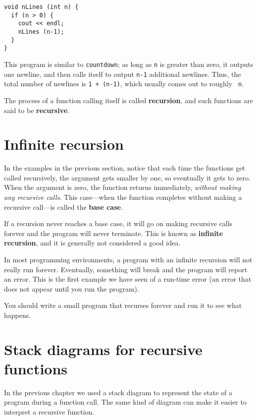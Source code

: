 \begin{verbatim}
void nLines (int n) {
  if (n > 0) {
    cout << endl;
    nLines (n-1);
  }
}
\end{verbatim}
%
This program is similar to {\tt countdown}; as long as {\tt n} is
greater than zero, it outputs one newline, and then calls itself to
output {\tt n-1} additional newlines.  Thus, the total number of
newlines is {\tt 1 + (n-1)}, which usually comes out to roughly {\tt
n}.


The process of a function calling itself is called {\bf recursion}, and
such functions are said to be {\bf recursive}.

\section {Infinite recursion}

In the examples in the previous section, notice that each time the
functions get called recursively, the argument gets smaller by one, so
eventually it gets to zero.  When the argument is zero, the function
returns immediately, {\em without making any recursive calls}.
This case---when the function completes without making a recursive
call---is called the {\bf base case}.

If a recursion never reaches a base case, it will go on making recursive
calls forever and the program will never terminate.  This is known as
{\bf infinite recursion}, and it is generally not considered a good
idea.


In most programming environments, a program with an infinite
recursion will not really run forever.  Eventually, something
will break and the program will report an error.  This is the
first example we have seen of a run-time error (an error that
does not appear until you run the program).

You should write a small program that recurses forever and run
it to see what happens.

\section {Stack diagrams for recursive functions}

In the previous chapter we used a stack diagram to represent the
state of a program during a function call.  The same kind
of diagram can make it easier to interpret a recursive function.

